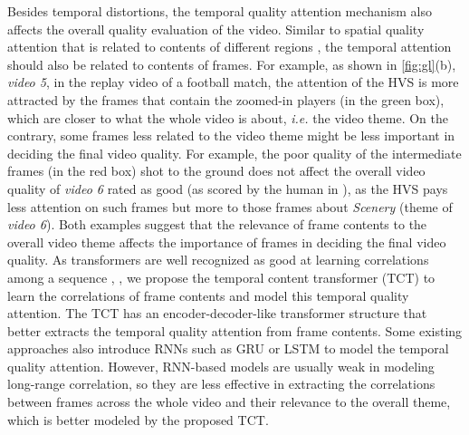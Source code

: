 \documentclass[journal]{IEEEtran}
\begin{document}
Besides temporal distortions, the temporal quality attention mechanism also affects the overall quality evaluation of the video. Similar to spatial quality attention that is related to contents of different regions \cite{musiq,hyperiqa}, the temporal attention should also be related to contents of frames. For example, as shown in \cref{fig:gl}(b), \textit{video 5}, in the replay video of a football match, the attention of the HVS is more attracted by the frames that contain the zoomed-in players (in the green box), which are closer to what the whole video is about, \textit{i.e.} the video theme. On the contrary, some frames less related to the video theme might be less important in deciding the final video quality. For example, the poor quality of the intermediate frames (in the red box) shot to the ground does not affect the overall video quality of \textit{video 6} rated as good (as scored by the human in \cite{pvq}), as the HVS pays less attention on such frames but more to those frames about \textit{Scenery} (theme of \textit{video 6}). Both examples suggest that the relevance of frame contents 
to the overall video theme affects the importance of frames in deciding the final video quality. As transformers are well recognized as good at learning correlations among a sequence \cite{bert}, \cite{allyouneed}, we propose the temporal content transformer (TCT) to learn the correlations of frame contents and model this temporal quality attention. The TCT has an encoder-decoder-like transformer structure that better extracts the temporal quality attention from frame contents. Some existing approaches \cite{vsfa, cnn+lstm, mdtvsfa, gstvqa} also introduce RNNs such as GRU \cite{gru} or LSTM \cite{lstm} to model the temporal quality attention. However, RNN-based models are usually weak in modeling long-range correlation, so they are less effective in extracting the correlations between frames across the whole video and their relevance to the overall theme, which is better modeled by the proposed TCT.
\end{document}
